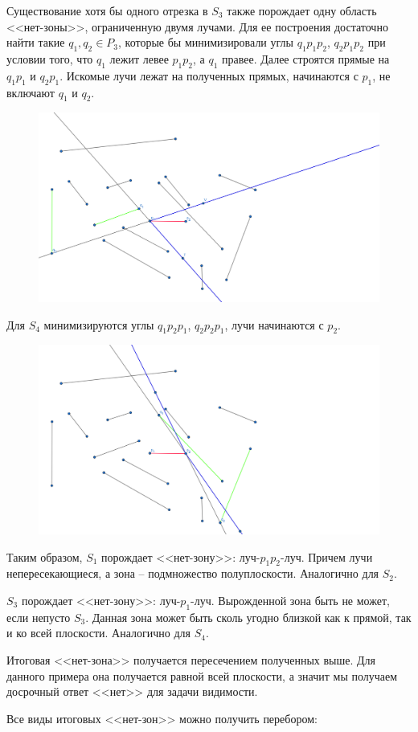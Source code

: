 \documentclass[letterpaper,12pt]{article}
\begin{document}
Существование хотя бы одного отрезка в $S_3$ также порождает
одну область <<нет-зоны>>, ограниченную двумя лучами.
Для ее построения достаточно найти такие  $q_1, q_2 \in P_3$,
которые бы минимизировали углы $q_1 p_1 p_2$, $q_2 p_1 p_2$
при условии того, что $q_1$ лежит левее $p_1 p_2$, а $q_1$
правее. Далее строятся прямые на $q_1 p_1$ и $q_2 p_1$. 
Искомые лучи лежат на полученных прямых, начинаются с 
$p_1$, не включают $q_1$ и $q_2$.
\begin{figure}[H]
      \centering
      \includegraphics[width=0.5\linewidth]{rays_3.png}
\end{figure}
\par
Для $S_4$ минимизируются углы $q_1 p_2 p_1$, $q_2 p_2 p_1$,
лучи начинаются с $p_2$.
\begin{figure}[H]
      \centering
      \includegraphics[width=0.5\linewidth]{rays_4.png}
\end{figure}
\par
Таким образом, $S_1$ порождает <<нет-зону>>: 
луч-$p_1 p_2$-луч. Причем лучи непересекающиеся, 
а зона -- подмножество полуплоскости. %
Аналогично для $S_2$.
\par
$S_3$ порождает <<нет-зону>>: луч-$p_1$-луч. 
Вырожденной зона быть не может, если непусто $S_3$.
Данная зона может быть сколь угодно близкой как к прямой,
так и ко всей плоскости.
Аналогично для $S_4$.
\par
Итоговая <<нет-зона>> получается пересечением полученных выше.
Для данного примера она получается равной всей плоскости, а
значит мы получаем досрочный ответ <<нет>> для задачи видимости.
\par
Все виды итоговых <<нет-зон>> можно получить перебором:
\end{document}
